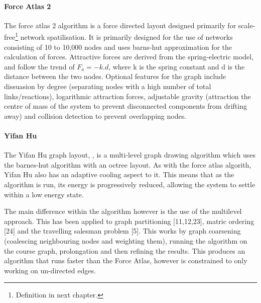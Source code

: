 \paragraph{Force Atlas 2}
The force atlas 2 \cite{fa} algorithm is a force directed layout designed primarily for scale-free\footnote{Definition in next chapter.} network spatilisation. It is primarily designed for the use of networks consisting of 10 to 10,000 nodes and uses barns-hut approximation for the calculation of forces. Attractive forces are derived from the spring-electric model, and follow the trend of $F_a = -k.d$, where k is the spring constant and d is the distance between the two nodes. Optional features for the graph include dissuasion by degree (separating nodes with a high number of total links/reactions), logarithmic attraction forces, adjustable gravity (attraction the centre of mass of the system to prevent disconnected components from drifting away) and collision detection to prevent overlapping nodes. 

\paragraph{Yifan Hu}
The Yifan Hu graph layout, \cite{yh}, is a multi-level graph drawing algorithm which uses the barnes-hut algorithm with an octree layout. As with the force atlas algorith, Yifan Hu also has an adaptive cooling aspect to it. This means that as the algorithm is run, its energy is progressively reduced, allowing the system to settle within a low energy state.  

The main difference within the algorithm however is the use of the multilevel approach. This has been applied to graph partitioning [11,12,23], matric ordering [24] and the travelling salesman problem [5]. This works by graph coarsening (coalescing neighbouring nodes and weighting them), running the algorithm on the course graph, prolongation and then refining the results. This produces an algorithm that runs faster than the Force Atlas, however is constrained to only working on un-directed edges.


